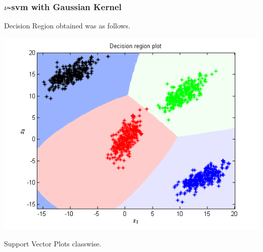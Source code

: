 \documentclass{article}
\begin{document}
\subsubsection{$\nu$-svm with Gaussian Kernel}
Decision Region obtained was as follows.
\begin{center}
\includegraphics[scale=1]{Classification/1a/nu_g/dec}
\end{center}
Support Vector Plots classwise.
\end{document}
